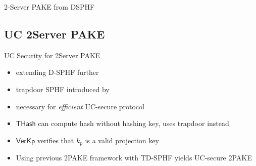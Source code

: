 \documentclass[notes,xcolor=dvipsnames]{beamer}
\begin{document}
\begin{frame}{2-Server PAKE from DSPHF}

		\begin{figure}
		\end{figure}

\end{frame}

\subsection{UC 2Server PAKE}

\begin{frame}{UC Security for 2Server PAKE}
  \begin{itemize}
    \item extending D-SPHF further
    \item trapdoor SPHF introduced by \cite{Benhamouda2013}
    \item necessary for \emph{efficient} UC-secure protocol
    \item $\mathsf{THash}$ can compute hash without hashing key, uses trapdoor instead
    \item $\mathsf{VerKp}$ verifies that $k_p$ is a valid projection key
    \item Using previous 2PAKE framework with TD-SPHF yields UC-secure 2PAKE
  \end{itemize}
\end{frame}
\end{document}
